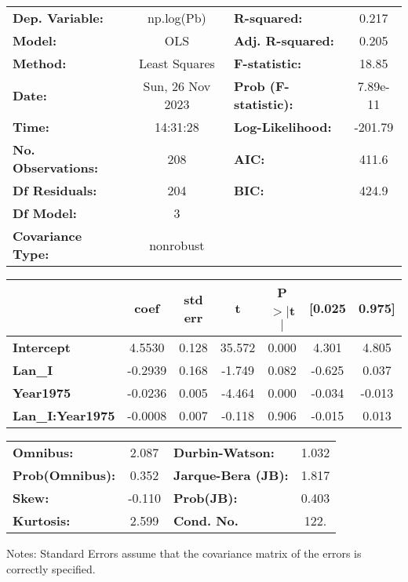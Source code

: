 \begin{center}
\begin{tabular}{lclc}
\toprule
\textbf{Dep. Variable:}    &    np.log(Pb)    & \textbf{  R-squared:         } &     0.217   \\
\textbf{Model:}            &       OLS        & \textbf{  Adj. R-squared:    } &     0.205   \\
\textbf{Method:}           &  Least Squares   & \textbf{  F-statistic:       } &     18.85   \\
\textbf{Date:}             & Sun, 26 Nov 2023 & \textbf{  Prob (F-statistic):} &  7.89e-11   \\
\textbf{Time:}             &     14:31:28     & \textbf{  Log-Likelihood:    } &   -201.79   \\
\textbf{No. Observations:} &         208      & \textbf{  AIC:               } &     411.6   \\
\textbf{Df Residuals:}     &         204      & \textbf{  BIC:               } &     424.9   \\
\textbf{Df Model:}         &           3      & \textbf{                     } &             \\
\textbf{Covariance Type:}  &    nonrobust     & \textbf{                     } &             \\
\bottomrule
\end{tabular}
\begin{tabular}{lcccccc}
                         & \textbf{coef} & \textbf{std err} & \textbf{t} & \textbf{P$> |$t$|$} & \textbf{[0.025} & \textbf{0.975]}  \\
\midrule
\textbf{Intercept}       &       4.5530  &        0.128     &    35.572  &         0.000        &        4.301    &        4.805     \\
\textbf{Lan\_I}          &      -0.2939  &        0.168     &    -1.749  &         0.082        &       -0.625    &        0.037     \\
\textbf{Year1975}        &      -0.0236  &        0.005     &    -4.464  &         0.000        &       -0.034    &       -0.013     \\
\textbf{Lan\_I:Year1975} &      -0.0008  &        0.007     &    -0.118  &         0.906        &       -0.015    &        0.013     \\
\bottomrule
\end{tabular}
\begin{tabular}{lclc}
\textbf{Omnibus:}       &  2.087 & \textbf{  Durbin-Watson:     } &    1.032  \\
\textbf{Prob(Omnibus):} &  0.352 & \textbf{  Jarque-Bera (JB):  } &    1.817  \\
\textbf{Skew:}          & -0.110 & \textbf{  Prob(JB):          } &    0.403  \\
\textbf{Kurtosis:}      &  2.599 & \textbf{  Cond. No.          } &     122.  \\
\bottomrule
\end{tabular}
\end{center}

Notes: \newline
 [1] Standard Errors assume that the covariance matrix of the errors is correctly specified.